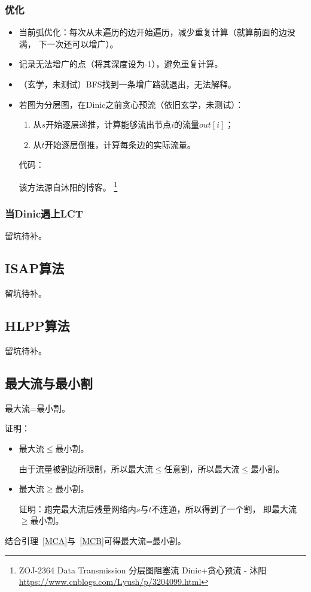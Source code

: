 \subsubsection{优化}
\begin{itemize}
	\item 当前弧优化：每次从未遍历的边开始遍历，减少重复计算（就算前面的边没满，
	      下一次还可以增广）。
	\item 记录无法增广的点（将其深度设为-1），避免重复计算。
	\item （玄学，未测试）BFS找到一条增广路就退出，无法解释。
	\item 若图为分层图，在Dinic之前贪心预流（依旧玄学，未测试）：
	      \begin{enumerate}
		      \item 从$s$开始逐层递推，计算能够流出节点$i$的流量$out[i]$；
		      \item 从$t$开始逐层倒推，计算每条边的实际流量。
	      \end{enumerate}
	      代码：

	      

	      该方法源自沐阳的博客。
	      \footnote{ZOJ-2364 Data Transmission 分层图阻塞流 Dinic+贪心预流 - 沐阳
		      \url{https://www.cnblogs.com/Lyush/p/3204099.html}}
\end{itemize}

\subsubsection{当Dinic遇上LCT}

留坑待补。

\subsection{ISAP算法}
留坑待补。
\subsection{HLPP算法}
留坑待补。
\subsection{最大流与最小割}

\begin{theorem}\label{MFMCT}
	最大流=最小割。
\end{theorem}

证明：
\begin{itemize}
	\item
	\begin{lemma}\label{MCA}
		最大流$\leq$最小割。
	\end{lemma}
	由于流量被割边所限制，所以最大流$\leq$任意割，所以最大流$\leq$最小割。
	\item
	\begin{lemma}\label{MCB}
		最大流$\geq$最小割。
	\end{lemma}
	证明：跑完最大流后残量网络内$s$与$t$不连通，所以得到了一个割，
	即最大流$\geq$最小割。
\end{itemize}

结合引理~\ref{MCA}与~\ref{MCB}可得最大流=最小割。
